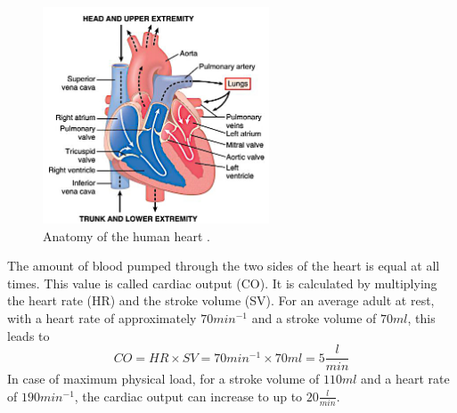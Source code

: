  \begin{figure}[h]
   \centering
   \includegraphics[width=0.6\textwidth]{images/heart_1.jpg}
   \caption{Anatomy of the human heart \cite{GH20}.}
   \label{fig:heart_anat}
 \end{figure}
 The amount of blood pumped through the two sides of the heart is equal at all times. This value is called cardiac output (CO). It is calculated by multiplying the heart rate (HR) and the stroke volume (SV). For an average adult at rest, with a heart rate of approximately $70 min^{-1}$ and a stroke volume of $70 ml$, this leads to
 \begin{equation}
   CO = HR \times SV = 70 min^{-1} \times 70 ml = 5 \frac{l}{min}
  \label{eq:CO}
 \end{equation}
In case of maximum physical load, for a stroke volume of $110 ml$ and a heart rate of $190 min^{-1}$,  the cardiac output can increase to up to $20\frac{l}{min}$. \cite{HKS4}

